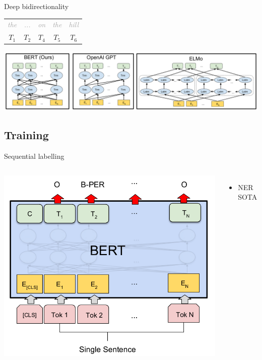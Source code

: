 \documentclass[pdf]{beamer}
\newcommand{\demo}[1]{\textit{\textcolor{darkgray}{#1}}}
\begin{document}
    \begin{frame}{Deep bidirectionality}
        \begin{center}
            \begin{tabular}{c c c c c}
                \demo{the} & \demo{...} & \demo{on} & \demo{the} & \demo{hill} \\
                $T_1$ & $T_2$ & $T_4$ & $T_5$ & $T_6$
            \end{tabular}
        \end{center}

        \includegraphics[width=\textwidth]{../figures/deeply_bidirectional.png}
    \end{frame}

    \subsection{Training}

    \begin{frame}{Sequential labelling}
        \vspace*{-1cm}
         \begin{columns}
            \begin{center}
                \includegraphics[height=0.87\textheight]{../figures/bert_ner.png}
            \end{center}
             \begin{itemize}
                \item NER SOTA
            \end{itemize}
        \end{columns}
    \end{frame}
\end{document}
